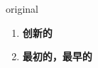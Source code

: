 
\begin{frame}
{\huge original}
\begin{center}
\begin{enumerate}\Large
  \item \textbf{创新的}
  \item \textbf{最初的，最早的}
\end{enumerate}
\end{center}
\end{frame}
